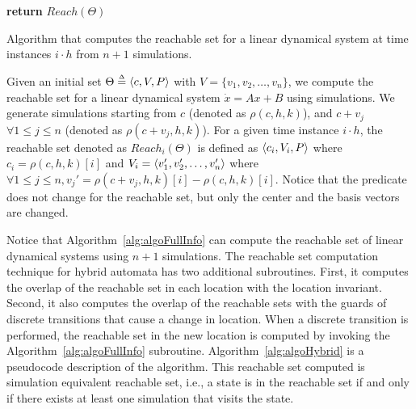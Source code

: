 \begin{algorithm}[h]
{\bf return} $Reach(\Theta)$\;
\caption{Algorithm that computes the reachable set for a linear dynamical system at time instances $i \cdot h$ from $n+1$ simulations.}
\label{alg:algoFullInfo}
\end{algorithm}

Given an initial set $\Theta \deq \tup{c, V, P}$ with $V = \{v_1, v_2, \ldots, v_n\}$, we compute the reachable set for a linear dynamical system $\dot{x} = Ax + B$ using simulations.
%
We generate simulations starting from $c$ (denoted as $\rho(c, h, k)$), and $c+v_j$ $\forall 1\leq j \leq n$ (denoted as $\rho(c+v_j, h, k)$). 
%
For a given time instance $i\cdot h$, the reachable set denoted as $Reach_i(\Theta)$ is defined as $\tup{c_i, V_i, P}$ where $c_i = \rho(c, h, k)[i]$ and $V_i = \tup{v_1', v_2', \ldots, v_n'}$ where $\forall 1\leq j \leq n, v_j' = \rho(c+v_j, h, k)[i] - \rho(c, h, k)[i]$. 
%
Notice that the predicate does not change for the reachable set, but only the center and the basis vectors are changed.
%

Notice that Algorithm~\ref{alg:algoFullInfo} can compute the reachable set of linear dynamical systems using $n+1$ simulations. 
%
The reachable set computation technique for hybrid automata has two additional subroutines.
%
First, it computes the overlap of the reachable set in each location with the location invariant.
%
Second, it also computes the overlap of the reachable sets with the guards of discrete transitions that cause a change in location.
%
When a discrete transition is performed, the reachable set in the new location is computed by invoking the Algorithm~\ref{alg:algoFullInfo} subroutine.
%
Algorithm~\ref{alg:algoHybrid} is a pseudocode description of the algorithm. This reachable set computed is simulation equivalent reachable set, i.e., a state is in the reachable set if and only if there exists at least one simulation that visits the state.

